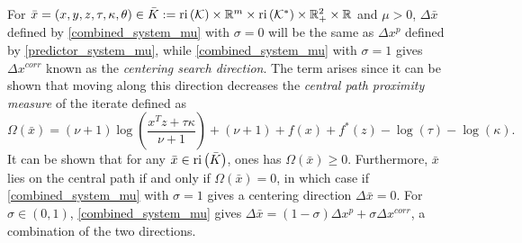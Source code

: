 \documentclass[10pt]{article}
\theoremstyle{definition}
\theoremstyle{plain}
\def\relint{\protect{\textnormal{ri}}}
\begin{document}
For $\bar x = (x,y,z,\tau,\kappa, \theta) \in \bar K := \relint\left(\mathcal{K}\right) \times \mathbb{R}^m \times \relint\left(\mathcal{K}^*\right)\times \mathbb{R}_+^2 \times \mathbb{R}$ and $\mu > 0$, $\Delta \bar x$ defined by  \eqref{combined_system_mu} with $\sigma = 0$ will be the same as $\Delta x^p$ defined by \eqref{predictor_system_mu}, while \eqref{combined_system_mu} with $\sigma = 1$ gives $\Delta x^{corr}$ known as the \textit{centering search direction}. The term arises since it can be shown that moving along this direction decreases the \textit{central path proximity measure} of the iterate defined as 
\[\Omega(\bar x) = (\nu+1) \log\left(\frac{x^T z + \tau\kappa}{\nu+1}\right) + (\nu+1)+ f(x)+f^*(z) - \log(\tau) - \log(\kappa).\] 
It can be shown that for any $\bar x \in \relint \left(\bar K\right)$, ones has $\Omega (\bar x) \geq 0$.  Furthermore, $\bar x $ lies on the central path if and only if $\Omega(\bar x)=0$, in which case if \eqref{combined_system_mu} with $\sigma = 1$ gives a centering direction $\Delta \bar x = 0$. For $\sigma \in \left(0,1\right)$, \eqref{combined_system_mu} gives $\Delta \bar x = (1-\sigma) \Delta x^p + \sigma \Delta x^{corr}$, a combination of the two directions. \\
\end{document}
